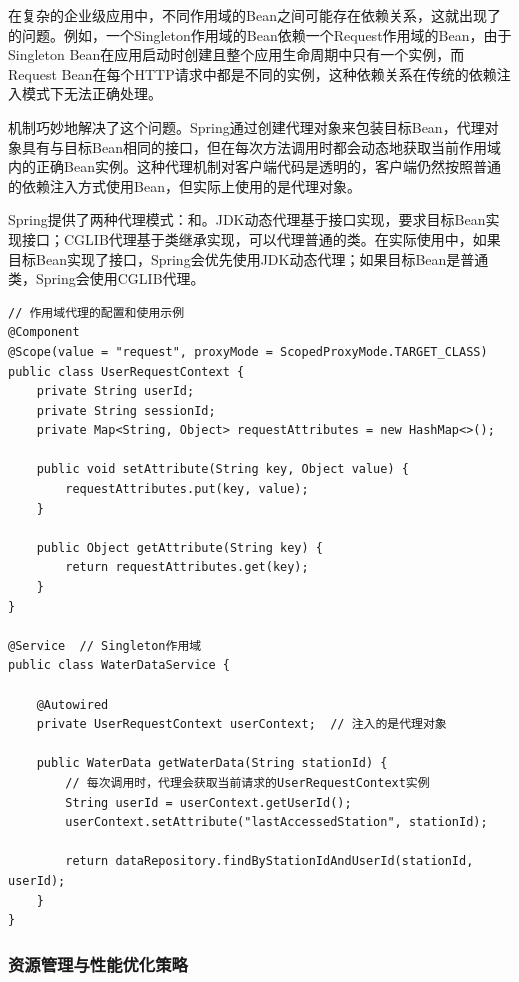 在复杂的企业级应用中，不同作用域的Bean之间可能存在依赖关系，这就出现了的问题。例如，一个Singleton作用域的Bean依赖一个Request作用域的Bean，由于Singleton Bean在应用启动时创建且整个应用生命周期中只有一个实例，而Request Bean在每个HTTP请求中都是不同的实例，这种依赖关系在传统的依赖注入模式下无法正确处理。

机制巧妙地解决了这个问题。Spring通过创建代理对象来包装目标Bean，代理对象具有与目标Bean相同的接口，但在每次方法调用时都会动态地获取当前作用域内的正确Bean实例。这种代理机制对客户端代码是透明的，客户端仍然按照普通的依赖注入方式使用Bean，但实际上使用的是代理对象。

Spring提供了两种代理模式：和。JDK动态代理基于接口实现，要求目标Bean实现接口；CGLIB代理基于类继承实现，可以代理普通的类。在实际使用中，如果目标Bean实现了接口，Spring会优先使用JDK动态代理；如果目标Bean是普通类，Spring会使用CGLIB代理。

\begin{lstlisting}[style=java]
// 作用域代理的配置和使用示例
@Component
@Scope(value = "request", proxyMode = ScopedProxyMode.TARGET_CLASS)
public class UserRequestContext {
    private String userId;
    private String sessionId;
    private Map<String, Object> requestAttributes = new HashMap<>();
    
    public void setAttribute(String key, Object value) {
        requestAttributes.put(key, value);
    }
    
    public Object getAttribute(String key) {
        return requestAttributes.get(key);
    }
}

@Service  // Singleton作用域
public class WaterDataService {
    
    @Autowired
    private UserRequestContext userContext;  // 注入的是代理对象
    
    public WaterData getWaterData(String stationId) {
        // 每次调用时，代理会获取当前请求的UserRequestContext实例
        String userId = userContext.getUserId();
        userContext.setAttribute("lastAccessedStation", stationId);
        
        return dataRepository.findByStationIdAndUserId(stationId, userId);
    }
}
\end{lstlisting}

\hypertarget{ux8d44ux6e90ux7ba1ux7406ux4e0eux6027ux80fdux4f18ux5316ux7b56ux7565}{%
\subsubsection{资源管理与性能优化策略}\label{ux8d44ux6e90ux7ba1ux7406ux4e0eux6027ux80fdux4f18ux5316ux7b56ux7565}}

